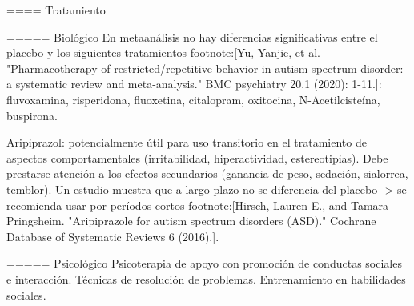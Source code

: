 \documentclass[encares.tex]{subfiles}
\begin{document}
==== Tratamiento

===== Biológico
En metaanálisis no hay diferencias significativas entre el placebo y los siguientes tratamientos footnote:[Yu, Yanjie, et al. "Pharmacotherapy of restricted/repetitive behavior in autism spectrum disorder: a systematic review and meta-analysis." BMC psychiatry 20.1 (2020): 1-11.]: fluvoxamina, risperidona, fluoxetina, citalopram, oxitocina, N-Acetilcisteína, buspirona.

Aripiprazol: potencialmente útil para uso transitorio en el tratamiento de aspectos comportamentales (irritabilidad, hiperactividad, estereotipias). Debe prestarse atención a los efectos secundarios (ganancia de peso, sedación, sialorrea, temblor). Un estudio muestra que a largo plazo no se diferencia del placebo -> se recomienda usar por períodos cortos footnote:[Hirsch, Lauren E., and Tamara Pringsheim. "Aripiprazole for autism spectrum disorders (ASD)." Cochrane Database of Systematic Reviews 6 (2016).].

===== Psicológico
Psicoterapia de apoyo con promoción de conductas sociales e interacción.
Técnicas de resolución de problemas.
Entrenamiento en habilidades sociales.
\end{document}
